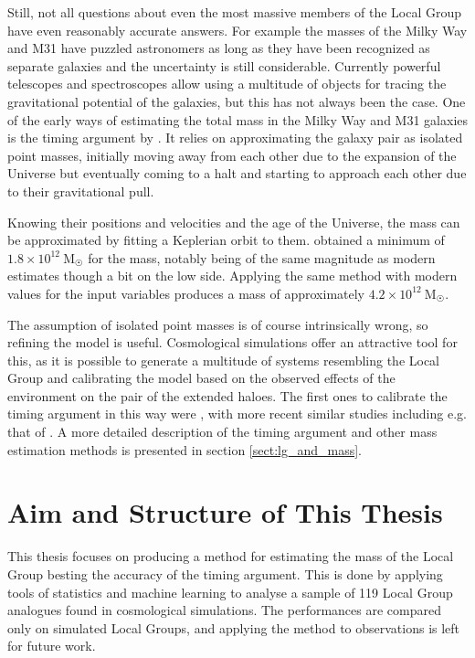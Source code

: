 \documentclass[english, twoside]{HYgradu}
\begin{document}
Still, not all questions about even the most massive members of the Local Group have even reasonably accurate answers. For example the masses of the Milky Way and M31 have puzzled astronomers as long as they have been recognized as separate galaxies and the uncertainty is still considerable. Currently powerful telescopes and spectroscopes allow using a multitude of objects for tracing the gravitational potential of the galaxies, but this has not always been the case. One of the early ways of estimating the total mass in the Milky Way and M31 galaxies is the timing argument by \citet{kahn1959intergalactic}. It relies on approximating the galaxy pair as isolated point masses, initially moving away from each other due to the expansion of the Universe but eventually coming to a halt and starting to approach each other due to their gravitational pull.

Knowing their positions and velocities and the age of the Universe, the mass can be approximated by fitting a Keplerian orbit to them. \citeauthor{kahn1959intergalactic} obtained a minimum of $1.8 \times 10^{12}\ \mathrm{M}_{\astrosun}$ for the mass, notably being of the same magnitude as modern estimates though a bit on the low side. Applying the same method with modern values for the input variables produces a mass of approximately $4.2 \times 10^{12}\ \mathrm{M}_{\astrosun}$.

The assumption of isolated point masses is of course intrinsically wrong, so refining the model is useful. Cosmological simulations offer an attractive tool for this, as it is possible to generate a multitude of systems resembling the Local Group and calibrating the model based on the observed effects of the environment on the pair of the extended haloes. The first ones to calibrate the timing argument in this way were \citet{kroeker1991accuracy}, with more recent similar studies including e.g. that of \citet{li2008masses}. A more detailed description of the timing argument and other mass estimation methods is presented in section \ref{sect:lg_and_mass}.


\section{Aim and Structure of This Thesis}
This thesis focuses on producing a method for estimating the mass of the Local Group besting the accuracy of the timing argument. This is done by applying tools of statistics and machine learning to analyse a sample of 119 Local Group analogues found in cosmological simulations. The performances are compared only on simulated Local Groups, and applying the method to observations is left for future work.
\end{document}
